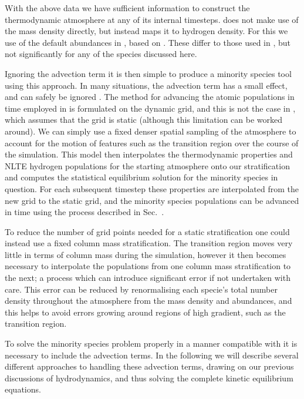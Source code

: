 With the above data we have sufficient information to construct the \Radyn{} thermodynamic atmosphere at any of its internal timesteps.
\Lw{} does not make use of the mass density directly, but instead maps it to hydrogen density.
For this we use of the default abundances in \Lw{}, based on \citet{Asplund2009}.
These differ to those used in \Radyn{}, but not significantly for any of the species discussed here.

Ignoring the advection term it is then simple to produce a minority species tool using this approach.
In many situations, the advection term has a small effect, and can safely be ignored \NeedRef{} .
The method for advancing the atomic populations in time employed in \Radyn{} is formulated on the dynamic grid, and this is not the case in \Lw{}, which assumes that the grid is static (although this limitation can be worked around).
We can simply use a fixed denser spatial sampling of the atmosphere to account for the motion of features such as the transition region over the course of the simulation.
This model then interpolates the thermodynamic properties and NLTE hydrogen populations for the starting atmosphere onto our stratification and computes the statistical equilibrium solution for the minority species in question.
For each subsequent timestep these properties are interpolated from the new \Radyn{} grid to the static grid, and the minority species populations can be advanced in time using the process described in Sec.~\NeedRef{}.

To reduce the number of grid points needed for a static stratification one could instead use a fixed column mass stratification.
The transition region moves very little in terms of column mass during the simulation, however it then becomes necessary to interpolate the populations from one column mass stratification to the next; a process which can introduce significant error if not undertaken with care.
This error can be reduced by renormalising each specie's total number density throughout the atmosphere from the mass density and abundances, and this helps to avoid errors growing around regions of high gradient, such as the transition region.

To solve the minority species problem properly in a manner compatible with \Radyn{} it is necessary to include the advection terms.
In the following we will describe several different approaches to handling these advection terms, drawing on our previous discussions of hydrodynamics, and thus solving the complete kinetic equilibrium equations.

